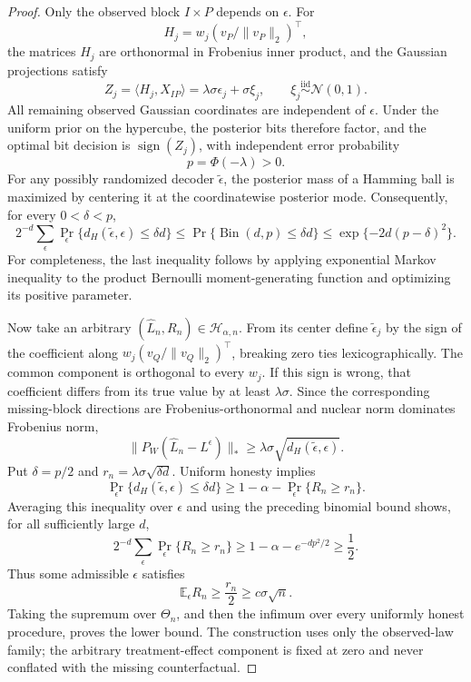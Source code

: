 \documentclass{article}
\begin{document}
\begin{proof}
Only the observed block \(I\times P\) depends on \(\epsilon\).  For
\[
H_j=w_j(v_P/\lVert v_P\rVert_2)^{\top},
\]
the matrices \(H_j\) are orthonormal in Frobenius inner product, and the Gaussian projections satisfy
\[
Z_j=\langle H_j,X_{IP}\rangle
=\lambda\sigma\epsilon_j+\sigma\xi_j,
\qquad
\xi_j\overset{\mathrm{iid}}{\sim}\mathcal N(0,1).
\]
All remaining observed Gaussian coordinates are independent of \(\epsilon\).  Under the uniform prior on the hypercube, the posterior bits therefore factor, and the optimal bit decision is
\(\operatorname{sign}(Z_j)\), with independent error probability
\[
p=\Phi(-\lambda)>0.
\]
For any possibly randomized decoder \(\widetilde\epsilon\), the posterior mass of a Hamming ball is maximized by centering it at the coordinatewise posterior mode.  Consequently, for every \(0<\delta<p\),
\[
2^{-d}\sum_\epsilon
\Pr_\epsilon\{d_H(\widetilde\epsilon,\epsilon)\le\delta d\}
\le\Pr\{\operatorname{Bin}(d,p)\le\delta d\}
\le\exp\{-2d(p-\delta)^2\}.
\]
For completeness, the last inequality follows by applying exponential Markov inequality to the product Bernoulli moment-generating function and optimizing its positive parameter.

Now take an arbitrary \((\widehat L_n,R_n)\in\mathcal H_{\alpha,n}\).  From its center define \(\widetilde\epsilon_j\) by the sign of the coefficient along
\(w_j(v_Q/\lVert v_Q\rVert_2)^{\top}\), breaking zero ties lexicographically.  The common component is orthogonal to every \(w_j\).  If this sign is wrong, that coefficient differs from its true value by at least \(\lambda\sigma\).  Since the corresponding missing-block directions are Frobenius-orthonormal and nuclear norm dominates Frobenius norm,
\[
\lVert P_W(\widehat L_n-L^\epsilon)\rVert_*
\ge\lambda\sigma\sqrt{d_H(\widetilde\epsilon,\epsilon)}.
\]
Put \(\delta=p/2\) and \(r_n=\lambda\sigma\sqrt{\delta d}\).  Uniform honesty implies
\[
\Pr_\epsilon\{d_H(\widetilde\epsilon,\epsilon)\le\delta d\}
\ge1-\alpha-\Pr_\epsilon\{R_n\ge r_n\}.
\]
Averaging this inequality over \(\epsilon\) and using the preceding binomial bound shows, for all sufficiently large \(d\),
\[
2^{-d}\sum_\epsilon\Pr_\epsilon\{R_n\ge r_n\}
\ge1-\alpha-e^{-dp^2/2}\ge\frac12.
\]
Thus some admissible \(\epsilon\) satisfies
\[
\mathbb E_\epsilon R_n\ge\frac{r_n}{2}
\ge c\sigma\sqrt n.
\]
Taking the supremum over \(\Theta_n\), and then the infimum over every uniformly honest procedure, proves the lower bound.  The construction uses only the observed-law family; the arbitrary treatment-effect component is fixed at zero and never conflated with the missing counterfactual.
\end{proof}
\end{document}
